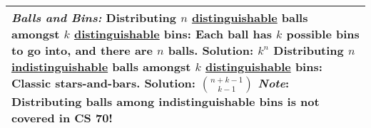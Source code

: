 {\begin{tabu}{|p{16cm} |}
\textit{Balls and Bins:} \newline
\textbf{Distributing $n$ \underline{distinguishable} balls amongst $k$ \underline{distinguishable} bins:} Each ball has $k$ possible bins to go into, and there are $n$ balls. Solution: $k^{n}$ \newline
\textbf{Distributing $n$ \underline{indistinguishable} balls amongst $k$ \underline{distinguishable} bins:} Classic stars-and-bars. Solution: ${n+k-1 \choose k-1}$ \newline
\textit{Note}: Distributing balls among indistinguishable bins is not covered in CS 70! 
\newline
\\
\hline
\end{tabu}
}



